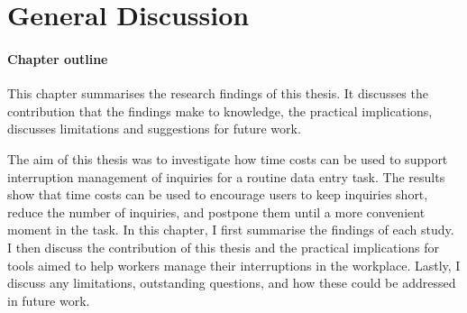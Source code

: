 \chapter{General Discussion}

\begin{mynote}
\subsubsection{Chapter outline}
This chapter summarises the research findings of this thesis. It discusses the contribution that the findings make to knowledge, the practical implications, discusses limitations and suggestions for future work.
\end{mynote}

The aim of this thesis was to investigate how time costs can be used to support interruption management of inquiries for a routine data entry task.
The results show that time costs can be used to encourage users to keep inquiries short, reduce the number of inquiries, and postpone them until a more convenient moment in the task. In this chapter, I first summarise the findings of each study. I then discuss the contribution of this thesis and the practical implications for tools aimed to help workers manage their interruptions in the workplace. Lastly, I discuss any limitations, outstanding questions, and how these could be addressed in future work. 

